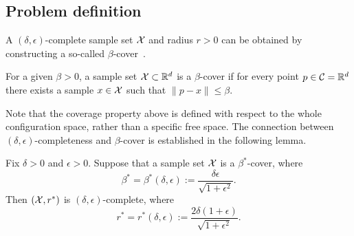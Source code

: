 



\subsection{Problem definition}
A $(\delta,\epsilon)$-complete sample set $\mathcal{X}$ and radius $r>0$ can be obtained by constructing a so-called $\beta$-cover~\cite{dayan2023near}. 

\begin{definition}
For a given $\beta>0$, a sample set $\mathcal{X}\subset \mathbb{R}^d$ is a $\beta$-cover if for every point $p\in \mathcal{C}=\mathbb{R}^d$ there exists a sample $x \in \mathcal{X}$ such that $\|p-x\|\leq \beta$.
\end{definition}

Note that the coverage property above is defined with respect to the whole configuration space, rather than a specific free space. The connection between $(\delta,\epsilon)$-completeness and $\beta$-cover is established in the following lemma.
\begin{lemma}\label{lem:cover}
  Fix $\delta >0$ and $\epsilon>0$. Suppose that a sample set $\mathcal{X}$ is a ${\beta^*}$-cover, where
  \begin{equation}
    {\beta^*}={\beta^*}(\delta,\epsilon):=\frac{\delta\epsilon}{\sqrt{1+\epsilon^2}}.
  \end{equation}
  Then $(\mathcal{X},{r^*})$ is $(\delta,\epsilon)$-complete, where
  \begin{equation}
      {r^*}={r^*}(\delta,\epsilon):=\frac{2\delta(1+\epsilon)}{\sqrt{1+\epsilon^2}}.
  \end{equation}
\end{lemma}

